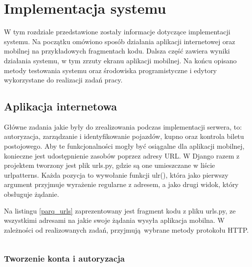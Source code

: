 \setcounter{listing}{0}

\section{Implementacja systemu}

W tym rozdziale przedstawione zostały informacje dotyczące implementacji systemu. Na początku omówiono sposób działania aplikacji internetowej oraz mobilnej na przykładowych fragmentach kodu. Dalsza część zawiera wyniki działania systemu, w tym zrzuty ekranu aplikacji mobilnej. Na końcu opisano metody testowania systemu oraz środowiska programistyczne i edytory wykorzystane do realizacji zadań pracy.

\subsection{Aplikacja internetowa}

Główne zadania jakie były do zrealizowania podczas implementacji serwera, to: autoryzacja, zarządzanie i identyfikowanie pojazdów, kupno oraz kontrola biletu postojowego. Aby te funkcjonalności mogły być osiągalne dla aplikacji mobilnej, konieczne jest udostępnienie zasobów poprzez adresy URL. W Django razem z projektem tworzony jest plik urls.py, gdzie są one umieszczane w liście urlpatterns. Każda pozycja to wywołanie funkcji ulr(), która jako pierwszy argument przyjmuje wyrażenie regularne z adresem, a jako drugi widok, który obsługuje żądanie.

Na listingu \ref{parq_urls} zaprezentowany jest fragment kodu z pliku urls.py, ze wszystkimi adresami na jakie swoje żądania wysyła aplikacja mobilna. W zależności od realizowanych zadań, przyjmują wybrane metody protokołu HTTP.

\begin{singlespace}
	\label{parq_urls}
	\vspace{0.3cm}
	\inputminted[fontsize=\footnotesize, linenos=true]{python}{src/imp/urlpatterns.py}
\end{singlespace}

\subsubsection*{Tworzenie konta i autoryzacja}

